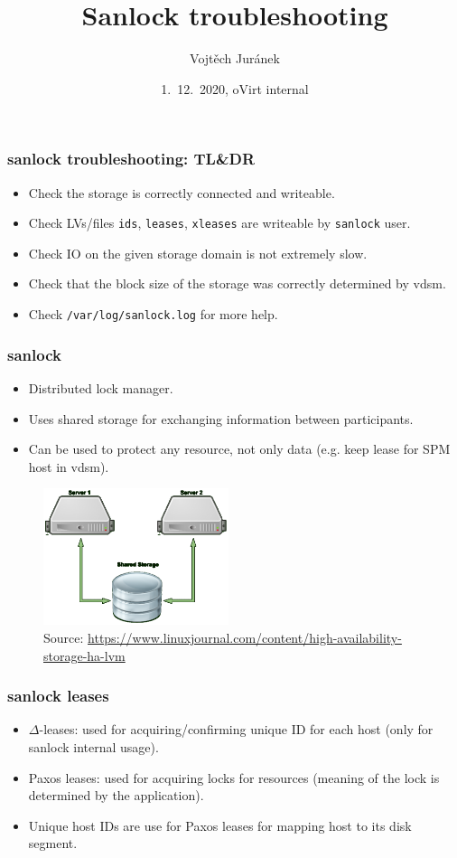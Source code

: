 \documentclass[10pt,utf8]{beamer}
\title{Sanlock troubleshooting}
\author{Vojtěch Juránek}
\institute[Red Hat]{oVirt storage team}
\date{1.~12.~2020, oVirt internal}
\begin{document}
\begin{frame}
    \titlepage
\end{frame}

\begin{frame}
    \frametitle{sanlock troubleshooting: TL\&DR}
        \begin{itemize}
            \item Check the storage is correctly connected and writeable.
            \item Check LVs/files \texttt{ids}, \texttt{leases}, \texttt{xleases} are writeable by \texttt{sanlock} user.
            \item Check IO on the given storage domain is not extremely slow.
            \item Check that the block size of the storage was correctly determined by vdsm.
            \item Check \texttt{/var/log/sanlock.log} for more help.
        \end{itemize}
\end{frame}

\begin{frame}
  \frametitle{sanlock}
    \begin{itemize}
        \item Distributed lock manager.
        \item Uses shared storage for exchanging information between participants.
        \item Can be used to protect any resource, not only data (e.g. keep lease for SPM host in vdsm).
    \end{itemize}

  \begin{figure}
    \centering
    \includegraphics[height=4cm]{./img/disk-paxos.eps}
    \caption{\tiny{Source: \url{https://www.linuxjournal.com/content/high-availability-storage-ha-lvm}}}
 \end{figure}
\end{frame}

\begin{frame}
  \frametitle{sanlock leases}
    \begin{itemize}
        \item $\Delta$-leases: used for acquiring/confirming unique ID for each host (only for sanlock internal usage).
        \item Paxos leases: used for acquiring locks for resources (meaning of the lock is determined by the application).
        \item Unique host IDs are use for Paxos leases for mapping host to its disk segment.
    \end{itemize}
\end{frame}
\end{document}
